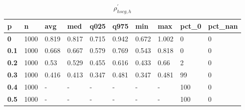 \begin{table}[h]
 \centering 
\footnotesize
\caption{$\rho_{hscg,h}^\prime $}
\label{tab:alphahscgh}
\begin{tabular}[h]{|l|l|l|l|l|l|l|l|l|l|
    } \hline
\textbf{ p} & \textbf{ n} & \textbf{ avg} & \textbf{ med} & \textbf{ q025} & \textbf{ q975} & \textbf{ min} & \textbf{ max} & \textbf{ pct\_0} & \textbf{ pct\_nan}
    \\ \hline
  \textbf{  0} & 1000 & 0.819 & 0.817 & 0.715 & 0.942 & 0.672 & 1.002 &   0 & 0
    \\ \hline
  \textbf{0.1} & 1000 & 0.668 & 0.667 & 0.579 & 0.769 & 0.543 & 0.818 &   0 & 0
    \\ \hline
  \textbf{0.2} & 1000 &  0.53 & 0.529 & 0.455 & 0.616 & 0.433 &  0.66 &   2 & 0
    \\ \hline
  \textbf{0.3} & 1000 & 0.416 & 0.413 & 0.347 & 0.481 & 0.347 & 0.481 &  99 & 0
    \\ \hline
  \textbf{0.4} & 1000 & - & - & - & - & - & - & 100 & 0
    \\ \hline
  \textbf{0.5} & 1000 & - & - & - & - & - & - & 100 & 0
    \\ \hline
 \end{tabular}
 \end{table}
